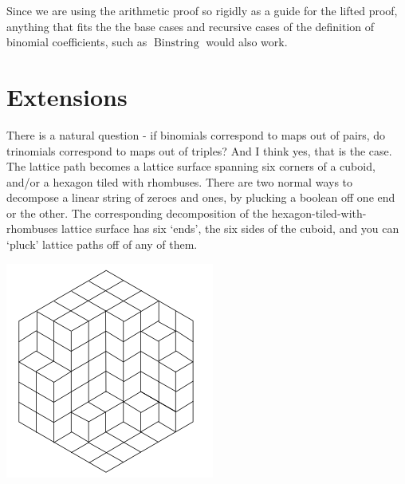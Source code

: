 \documentclass{proc-l}
\theoremstyle{definition}
\theoremstyle{remark}
\numberwithin{equation}{section}
\begin{document}
Since we are using the arithmetic proof so rigidly as a guide for the lifted proof, anything that fits the the base cases and recursive cases of the definition of binomial coefficients, such as \(\operatorname{Binstring}\) would also work.

\section{Extensions}

There is a natural question - if binomials correspond to maps out of pairs, do trinomials correspond to maps out of triples? And I think yes, that is the case. The lattice path becomes a lattice surface spanning six corners of a cuboid, and/or a hexagon tiled with rhombuses. There are two normal ways to decompose a linear string of zeroes and ones, by plucking a boolean off one end or the other. The corresponding decomposition of the hexagon-tiled-with-rhombuses lattice surface has six `ends', the six sides of the cuboid, and you can `pluck' lattice paths off of any of them.

\includegraphics{hexagon}


\end{document}
